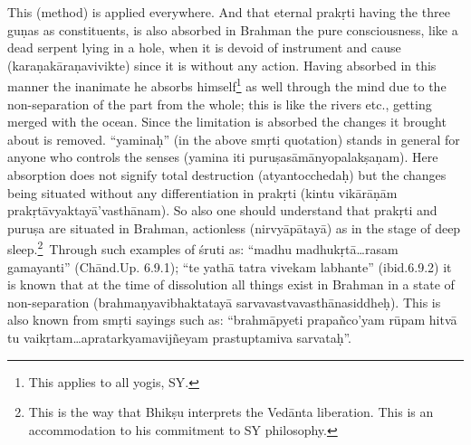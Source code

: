 This (method) is applied everywhere. And that eternal prakṛti having the three guṇas as constituents, is also absorbed in Brahman the pure consciousness, like a dead serpent lying in a hole, when it is devoid of instrument and cause (karaṇakāraṇavivikte) since it is without any action. Having absorbed in this manner the inanimate he absorbs himself\footnote{This applies to all yogis, SY.} as well through the mind due to the non-separation of the part from the whole; this is like the rivers etc., getting merged with the ocean. Since the limitation is absorbed the changes it brought about is removed. “yaminaḥ” (in the above smṛti quotation) stands in general for anyone who controls the senses (yamina iti puruṣasāmānyopalakṣaṇam). Here absorption does not signify total destruction (atyantocchedaḥ) but the changes being situated without any differentiation in prakṛti (kintu vikārāṇām prakṛtāvyaktayā’vasthānam). So also one should understand that prakṛti and puruṣa are situated in Brahman, actionless (nirvyāpātayā) as in the stage of deep sleep.\footnote{This is the way that Bhikṣu interprets the Vedānta liberation. This is an accommodation to his commitment to SY philosophy.} Through such examples of śruti as: “madhu madhukṛtā…rasam gamayanti” (Chānd.Up. 6.9.1); “te yathā tatra vivekam labhante” (ibid.6.9.2) it is known that at the time of dissolution all things exist in Brahman in a state of non-separation (brahmaṇyavibhaktatayā sarvavastvavasthānasiddheḥ). This is also known from smṛti sayings such as: “brahmāpyeti prapañco’yam rūpam hitvā tu vaikṛtam…apratarkyamavijñeyam prastuptamiva sarvataḥ”.



